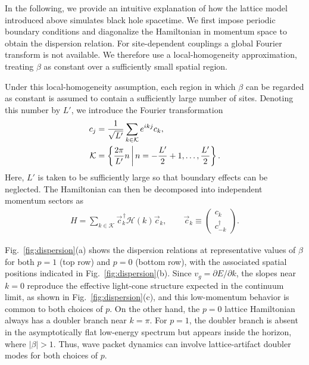 \documentclass[reprint,amsmath,amssymb,aps,prb]{revtex4-2}
\begin{document}
In the following, we provide an intuitive explanation of how the lattice model introduced above simulates black hole spacetime.
We first impose periodic boundary conditions and diagonalize the Hamiltonian in momentum space to obtain the dispersion relation.
For site-dependent couplings a global Fourier transform is not available.
We therefore use a local-homogeneity approximation, treating $\beta$ as constant over a sufficiently small spatial region.

Under this local-homogeneity assumption, each region in which $\beta$ can be regarded as constant is assumed to contain a sufficiently large number of sites.
Denoting this number by $L'$, we introduce the Fourier transformation
\begin{align}
c_j
&=
\frac{1}{\sqrt{L'}}
\sum_{k\in\mathcal{K}}
e^{ikj}c_k,
\notag\\
\mathcal{K}
&=
\left\{
\frac{2\pi}{L'}n
\,\bigg|\,
n=-\frac{L'}{2}+1,\ldots,\frac{L'}{2}
\right\}.
\label{eq:fourier_local}
\end{align}
Here, $L'$ is taken to be sufficiently large so that boundary effects can be neglected.
The Hamiltonian can then be decomposed into independent momentum sectors as
\begin{align}
H
=
\sum_{k\in\mathcal{K}}
\vec{c}_k^{\,\dagger}
\mathcal{H}(k)
\vec{c}_k,
\qquad
\vec{c}_k
\equiv
\begin{pmatrix}
c_k\\
c_{-k}^{\dagger}
\end{pmatrix}.
\end{align}

Fig.~\ref{fig:dispersion}(a) shows the dispersion relations at representative values of $\beta$ for both $p=1$ (top row) and $p=0$ (bottom row), with the associated spatial positions indicated in Fig.~\ref{fig:dispersion}(b).
Since $v_g=\partial E/\partial k$, the slopes near $k=0$ reproduce the effective light-cone structure expected in the continuum limit, as shown in Fig.~\ref{fig:dispersion}(c), and this low-momentum behavior is common to both choices of $p$.
On the other hand, the $p=0$ lattice Hamiltonian always has a doubler branch near $k=\pi$.
For $p=1$, the doubler branch is absent in the asymptotically flat low-energy spectrum but appears inside the horizon, where $|\beta|>1$.
Thus, wave packet dynamics can involve lattice-artifact doubler modes for both choices of $p$.
\end{document}
